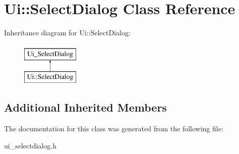 \hypertarget{class_ui_1_1_select_dialog}{}\section{Ui\+:\+:Select\+Dialog Class Reference}
\label{class_ui_1_1_select_dialog}
Inheritance diagram for Ui\+:\+:Select\+Dialog\+:\begin{figure}[H]
\begin{center}
\leavevmode
\includegraphics[height=2.000000cm]{class_ui_1_1_select_dialog}
\end{center}
\end{figure}
\subsection*{Additional Inherited Members}


The documentation for this class was generated from the following file\+:\begin{DoxyCompactItemize}
\item 
ui\+\_\+selectdialog.\+h\end{DoxyCompactItemize}
